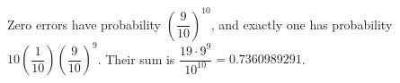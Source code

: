 Zero errors have probability $(\dfrac{9}{10})^{10}$, and exactly one has probability $10(\dfrac{1}{10})(\dfrac{9}{10})^9$. Their sum is $\boxed{\dfrac{19\cdot9^9}{10^{10}}=0.7360989291}$.
